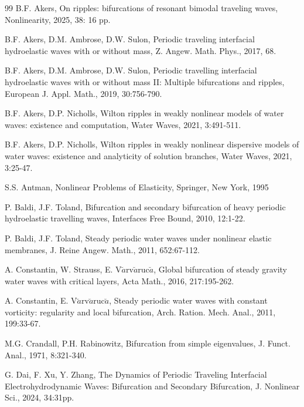 \documentclass[12pt]{article}
\numberwithin{equation}{section}
\numberwithin{equation}{section}
\begin{document}
\begin{thebibliography}{99}
B.F. Akers, On ripples: bifurcations of resonant bimodal traveling waves, Nonlinearity, 2025, 38: 16 pp.

B.F. Akers, D.M. Ambrose, D.W. Sulon, Periodic traveling interfacial hydroelastic
waves with or without mass, Z. Angew. Math. Phys., 2017, 68.

B.F. Akers, D.M. Ambrose, D.W. Sulon, Periodic travelling interfacial hydroelastic waves with or without mass II: Multiple bifurcations and ripples, European J. Appl. Math., 2019, 30:756-790.

B.F. Akers, D.P. Nicholls, Wilton ripples in weakly nonlinear models of water waves: existence and computation, Water Waves, 2021, 3:491-511.

B.F. Akers, D.P. Nicholls, Wilton ripples in weakly nonlinear dispersive models of water waves: existence and analyticity of solution branches, Water Waves, 2021, 3:25-47.

S.S. Antman, Nonlinear Problems of Elasticity, Springer, New York, 1995

P. Baldi, J.F. Toland, Bifurcation and secondary bifurcation of heavy periodic hydroelastic travelling waves, Interfaces Free Bound, 2010, 12:1-22.

P. Baldi, J.F. Toland, Steady periodic water waves under nonlinear elastic membranes, J. Reine Angew. Math., 2011, 652:67-112.


A. Constantin, W. Strauss, E. V$\breve{a}$rv$\breve{a}$ruc$\breve{a}$, Global bifurcation of steady gravity water waves with critical layers, Acta Math., 2016, 217:195-262.

A. Constantin, E. V$\breve{a}$rv$\breve{a}$ruc$\breve{a}$, Steady periodic water waves with constant vorticity: regularity and local bifurcation, Arch. Ration. Mech. Anal., 2011, 199:33-67.

M.G. Crandall, P.H. Rabinowitz, Bifurcation from simple eigenvalues, J. Funct. Anal., 1971, 8:321-340.

G. Dai, F. Xu, Y. Zhang, The Dynamics of Periodic Traveling Interfacial Electrohydrodynamic Waves: Bifurcation and Secondary Bifurcation, J. Nonlinear Sci., 2024, 34:31pp.


\end{thebibliography}
\end{document}
